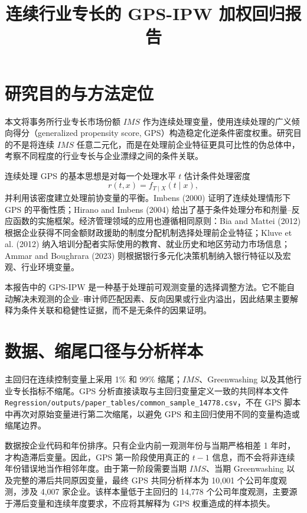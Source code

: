 \documentclass[11pt]{article}
\title{连续行业专长的 GPS-IPW 加权回归报告}
\author{}
\date{}
\begin{document}
\maketitle

\section{研究目的与方法定位}

本文将事务所行业专长市场份额 $IMS$ 作为连续处理变量，使用连续处理的广义倾向得分（generalized propensity score, GPS）构造稳定化逆条件密度权重。研究目的不是将连续 $IMS$ 任意二元化，而是在处理前企业特征更具可比性的伪总体中，考察不同程度的行业专长与企业漂绿之间的条件关联。

连续处理 GPS 的基本思想是对每一个处理水平 $t$ 估计条件处理密度
\[
r(t,x)=f_{T\mid X}(t\mid x),
\]
并利用该密度建立处理前协变量的平衡。Imbens (2000) 证明了连续处理情形下 GPS 的平衡性质；Hirano and Imbens (2004) 给出了基于条件处理分布和剂量--反应函数的实施框架。经济管理领域的应用也遵循相同原则：Bia and Mattei (2012) 根据企业获得不同金额财政援助的制度分配机制选择处理前企业特征；Kluve et al. (2012) 纳入培训分配者实际使用的教育、就业历史和地区劳动力市场信息；Ammar and Boughrara (2023) 则根据银行多元化决策机制纳入银行特征以及宏观、行业环境变量。

本报告中的 GPS-IPW 是一种基于处理前可观测变量的选择调整方法。它不能自动解决未观测的企业--审计师匹配因素、反向因果或行业内溢出，因此结果主要解释为条件关联和稳健性证据，而不是无条件的因果证明。

\section{数据、缩尾口径与分析样本}

主回归在连续控制变量上采用 1\% 和 99\% 缩尾；$IMS$、Greenwashing 以及其他行业专长指标不缩尾。GPS 分析直接读取与主回归变量定义一致的共同样本文件 \texttt{Regression/outputs/paper\_tables/common\_sample\_14778.csv}，不在 GPS 脚本中再次对原始变量进行第二次缩尾，以避免 GPS 和主回归使用不同的变量构造或缩尾边界。

数据按企业代码和年份排序。只有企业内前一观测年份与当期严格相差 1 年时，才构造滞后变量。因此，GPS 第一阶段使用真正的 $t-1$ 信息，而不会将非连续年份错误地当作相邻年度。由于第一阶段需要当期 $IMS$、当期 Greenwashing 以及完整的滞后共同原因变量，最终 GPS 共同分析样本为 10,001 个公司年度观测，涉及 4,007 家企业。该样本量低于主回归的 14,778 个公司年度观测，主要源于滞后变量和连续年度要求，不应将其解释为 GPS 权重造成的样本损失。
\end{document}
